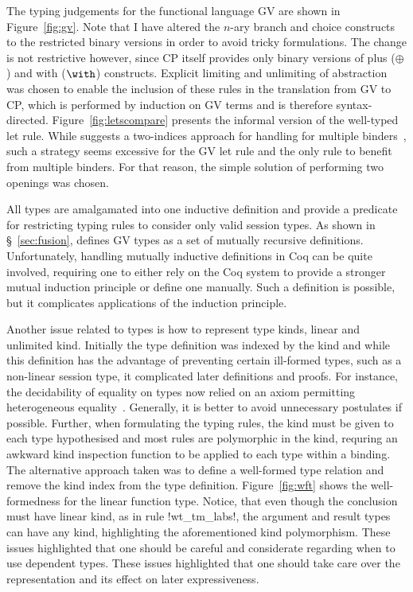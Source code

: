 


The typing judgements for the functional language GV are shown in
Figure~\ref{fig:gv}. Note that I have altered the $n$-ary branch and choice
constructs to the restricted binary versions in order to avoid tricky
formulations. The change is not restrictive however, since CP itself provides
only binary versions of plus ($\oplus$) and with ($\with$)
constructs. Explicit limiting and unlimiting of abstraction was chosen to
enable the inclusion of these rules in the translation from GV to CP, which is
performed by induction on GV terms and is therefore
syntax-directed. Figure~\ref{fig:letscompare} presents the informal version of
the well-typed let rule. While \citeauthor{Char:2012} suggests a two-indices
approach for handling for multiple binders~\cite{Char:2012}, such a strategy
seems excessive for the GV let rule and the only rule to benefit from multiple
binders. For that reason, the simple solution of performing two openings was
chosen.

All types are amalgamated into one inductive definition and provide a
predicate for restricting typing rules to consider only valid session
types. As shown in \S~\ref{sec:fusion}, \citeauthor{Wadler:2014} defines GV
types as a set of mutually recursive definitions. Unfortunately, handling
mutually inductive definitions in Coq can be quite involved, requiring one to
either rely on the Coq system to provide a stronger mutual induction principle
or define one manually. Such a definition is possible, but it complicates
applications of the induction principle.



Another issue related to types is how to represent type kinds, linear and
unlimited kind. Initially the type definition was indexed by the kind and
while this definition has the advantage of preventing certain ill-formed
types, such as a non-linear session type, it complicated later definitions and
proofs. For instance, the decidability of equality on types now relied on an
axiom permitting heterogeneous equality~\cite{McBride:1999}. Generally, it is
better to avoid unnecessary postulates if possible. Further, when formulating
the typing rules, the kind must be given to each type hypothesised and most
rules are polymorphic in the kind, requring an awkward kind inspection
function to be applied to each type within a binding. The alternative approach
taken was to define a well-formed type relation and remove the kind index from
the type definition. Figure~\ref{fig:wft} shows the well-formedness for the
linear function type. Notice, that even though the conclusion must have linear
kind, as in rule \coqe!wt_tm_labs!, the argument and result types can have any
kind, highlighting the aforementioned kind polymorphism. These issues
highlighted that one should be careful and considerate regarding when to use
dependent types. These issues highlighted that one should take care over the
representation and its effect on later expressiveness.

